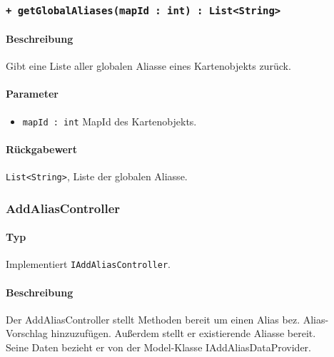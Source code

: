 \subsubsection*{\texttt{+ getGlobalAliases(mapId : int) : List<String>}}%
\paragraph*{Beschreibung}
Gibt eine Liste aller globalen Aliasse eines Kartenobjekts zurück.
\paragraph*{Parameter}
\begin{itemize}
    \item \texttt{mapId : int} MapId des Kartenobjekts.
\end{itemize}
\paragraph*{Rückgabewert}
\texttt{List<String>}, Liste der globalen Aliasse.

\subsubsection{AddAliasController}
\paragraph*{Typ}
Implementiert \texttt{IAddAliasController}.
\paragraph*{Beschreibung}
Der AddAliasController stellt Methoden bereit um einen Alias bez. Alias-Vorschlag hinzuzufügen. 
Außerdem stellt er existierende Aliasse bereit.\\
Seine Daten bezieht er von der Model-Klasse IAddAliasDataProvider.